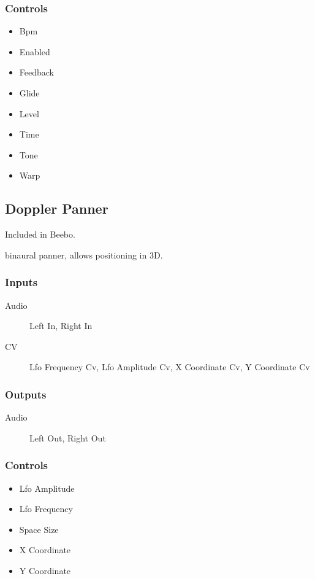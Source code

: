 \subsubsection{Controls}
\begin{itemize}
\item Bpm
\item Enabled
\item Feedback
\item Glide
\item Level
\item Time
\item Tone
\item Warp
\end{itemize}

\subsection{Doppler Panner}

Included in Beebo.

binaural panner, allows positioning in 3D.



\subsubsection{Inputs}
\begin{description}
\item [Audio] Left In, Right In
\item [CV] Lfo Frequency Cv, Lfo Amplitude Cv, X Coordinate Cv, Y Coordinate Cv
\end{description}

\subsubsection{Outputs}
\begin{description}
\item [Audio] Left Out, Right Out
\end{description}

\subsubsection{Controls}
\begin{itemize}
\item Lfo Amplitude
\item Lfo Frequency
\item Space Size
\item X Coordinate
\item Y Coordinate
\end{itemize}

